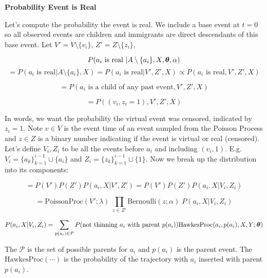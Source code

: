 \documentclass[11pt]{article}
\begin{document}

\vspace{1cm}
\noindent\textbf{Probability Event is Real}

\noindent Let's compute the probability the event is real. We include a base event at $t = 0$ so all observed events are children and immigrants are direct descendants of this base event. Let $V' = V \setminus \{v_i\}$, $Z' = Z \setminus \{z_i\}$,

\[
  P(a_i \text{ is real } | A \setminus \{a_i\}, X, \boldsymbol{\theta}, \alpha)
\]
\[
  =
  P(a_i \text{ is real} | A \setminus \{a_i\}, X)
  =
  P(a_i \text{ is real} | V', Z', X)
  \propto
  P(a_i \text{ is real}, V', Z', X)
\]

\[
  =
  P(a_i \text{ is a child of any past event}, V', Z', X)   
\]

\[
  =
  P((v_i,z_i=1) , V', Z', X)   
\]

\noindent In words, we want the probability the virtual event was censored, indicated by $z_i = 1$. Note $v \in V$ is the event time of an event sampled from the Poisson Process and $z \in Z$ is a binary number indicating if the event is virtual or real (censored). Let's define $V_i,Z_i$ to be all the events before $a_i$ and including $(v_i,1)$. E.g. $V_i = \{a_k\}_ {k=1}^{i-1} \cup \{a_i\}$ and $Z_i = \{z_k\}_{k=1}^{i-1} \cup \{1\}$. Now we break up the distribution into its components:

\[
  =
  P(V')P(Z')P(a_i, X | V', Z')
  =
  P(V')P(Z')P(a_i, X | V_i, Z_i)
\]

\[
  =
  \text{PoissonProc}(V'; \lambda)
  \;
  \prod_{z \in Z'}\text{Bernoulli}(z; \alpha) 
  \;
  P(a_i, X | V_i, Z_i)  
\]

\[
  P(a_i, X | V_i, Z_i)
  =
  \sum_{p(a_i) \in \mathcal{P}}
  P(\text{not thinning } a_i \text{ with parent } p(a_i))
  \text{HawkesProc}(a_i,p(a_i),X,Y; \boldsymbol{\theta})
\]

\noindent The $\mathcal{P}$ is the set of possible parents for $a_i$ and $p(a_i)$ is the parent event. The $\text{HawkesProc}(\cdots)$ is the probability of the trajectory with $a_i$ inserted with parent $p(a_i)$.
\end{document}

